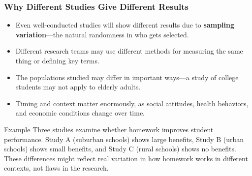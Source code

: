 \documentclass{beamer}
\begin{document}
	\begin{frame}
		\frametitle{Why Different Studies Give Different Results}
		
		\begin{itemize}
			\item Even well-conducted studies will show different results due to \textbf{sampling variation}—the natural randomness in who gets selected.
			\item Different research teams may use different methods for measuring the same thing or defining key terms.
			\item The populations studied may differ in important ways—a study of college students may not apply to elderly adults.
			\item Timing and context matter enormously, as social attitudes, health behaviors, and economic conditions change over time.
		\end{itemize}
		
		\begin{exampleblock}{Example}
			Three studies examine whether homework improves student performance. Study A (suburban schools) shows large benefits, Study B (urban schools) shows small benefits, and Study C (rural schools) shows no benefits. These differences might reflect real variation in how homework works in different contexts, not flaws in the research.
		\end{exampleblock}
		
	\end{frame}
	
\end{document}
